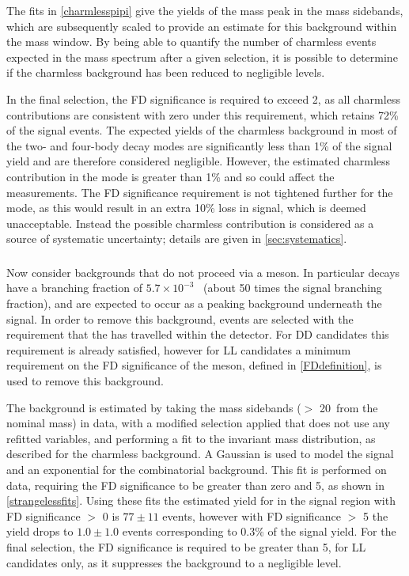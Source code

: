 The fits in \fig\ref{charmlesspipi} give the yields of the \Bm mass peak in the \Dz mass sidebands, which are subsequently scaled to provide an estimate for this background within the \Dz mass window. By being able to quantify the number of charmless events expected in the \Bm mass spectrum after a given selection, it is possible to determine if the charmless background has been reduced to negligible levels. 

In the final selection, the \Dz FD significance is required to exceed 2, as all charmless contributions are consistent with zero under this requirement, which retains 72\% of the signal events. The expected yields of the charmless background in most of the two- and four-body \Dz decay modes are significantly less than 1\% of the signal yield and are therefore considered negligible. However, the estimated charmless contribution in the \pipi mode is greater than 1\% and so could affect the measurements. The \Dz FD significance requirement is not tightened further for the \pipi mode, as this would result in an extra 10\% loss in signal, which is deemed unacceptable. Instead the possible charmless contribution is considered as a source of systematic uncertainty; details are given in \sect\ref{sec:systematics}. 

\subsubsection{\boldmath \decay{\Bm}{\D\pim\pip\pim}}
\label{sec:backgrounds:b2dpipipi}

Now consider backgrounds that do not proceed via a \KS meson. In particular \decay{\Bm}{\D\pim\pip\pim} decays have a branching fraction of $5.7 \times 10^{-3}$~\cite{PDG2014} (about 50 times the signal \decay{\Bm}{\D\Kstarm(\KS(\pip\pim)\pim)} branching fraction), and are expected to occur as a peaking background underneath the signal. In order to remove this background, events are selected with the requirement that the \KS has travelled within the detector. For DD candidates this requirement is already satisfied, however for LL candidates a minimum requirement on the FD significance of the \KS meson, defined in \eqn\ref{FDdefinition}, is used to remove this background. 

The \decay{\Bm}{\D\pim\pip\pim} background is estimated by taking the \KS mass sidebands ($>$ 20~\mevcc from the nominal \KS mass) in data, with a modified selection applied that does not use any refitted variables, and performing a fit to the invariant \Bm mass distribution, as described for the charmless background. A Gaussian is used to model the signal and an exponential for the combinatorial background. This fit is performed on \kpi data, requiring the \KS FD significance to be greater than zero and 5, as shown in \fig\ref{strangelessfits}. Using these fits the estimated \decay{\Bm}{\D\pim\pip\pim} yield for \runtwo in the signal region with \KS FD significance $>$ 0 is $77 \pm 11$ events, however with \KS FD significance $>$ 5 the yield drops to $1.0 \pm 1.0$ events corresponding to 0.3\% of the signal yield. For the final selection, the \KS FD significance is required to be greater than 5, for LL candidates only, as it suppresses the \decay{\Bm}{\D\pim\pip\pim} background to a negligible level.

